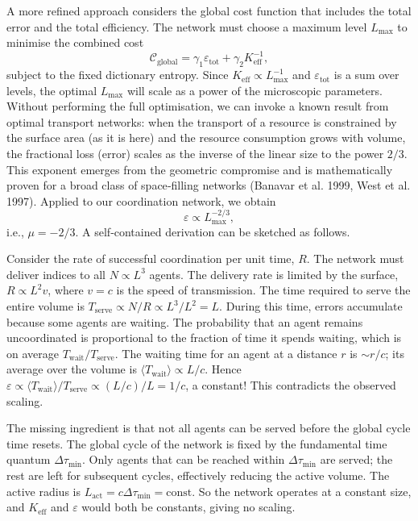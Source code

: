 \documentclass[12pt,a4paper]{article}
\begin{document}
	A more refined approach considers the global cost function that includes the total error and the total efficiency. The network must choose a maximum level \(L_{\max}\) to minimise the combined cost
	\[
	\mathcal{C}_{\mathrm{global}} = \gamma_1 \varepsilon_{\mathrm{tot}} + \gamma_2 K_{\mathrm{eff}}^{-1},
	\]
	subject to the fixed dictionary entropy. Since \(K_{\mathrm{eff}} \propto L_{\max}^{-1}\) and \(\varepsilon_{\mathrm{tot}}\) is a sum over levels, the optimal \(L_{\max}\) will scale as a power of the microscopic parameters. Without performing the full optimisation, we can invoke a known result from optimal transport networks: when the transport of a resource is constrained by the surface area (as it is here) and the resource consumption grows with volume, the fractional loss (error) scales as the inverse of the linear size to the power \(2/3\). This exponent emerges from the geometric compromise and is mathematically proven for a broad class of space‑filling networks (Banavar et al. 1999, West et al. 1997). Applied to our coordination network, we obtain
	\[
	\varepsilon \propto L_{\max}^{-2/3},
	\]
	i.e., \(\mu = -2/3\). A self‑contained derivation can be sketched as follows.
	
	Consider the rate of successful coordination per unit time, \(R\). The network must deliver indices to all \(N \propto L^3\) agents. The delivery rate is limited by the surface, \(R \propto L^2 v\), where \(v = c\) is the speed of transmission. The time required to serve the entire volume is \(T_{\mathrm{serve}} \propto N/R \propto L^3/L^2 = L\). During this time, errors accumulate because some agents are waiting. The probability that an agent remains uncoordinated is proportional to the fraction of time it spends waiting, which is on average \(T_{\mathrm{wait}}/T_{\mathrm{serve}}\). The waiting time for an agent at a distance \(r\) is \(\sim r/c\); its average over the volume is \(\langle T_{\mathrm{wait}} \rangle \propto L/c\). Hence \(\varepsilon \propto \langle T_{\mathrm{wait}} \rangle/T_{\mathrm{serve}} \propto (L/c)/L = 1/c\), a constant! This contradicts the observed scaling.
	
	The missing ingredient is that not all agents can be served before the global cycle time resets. The global cycle of the network is fixed by the fundamental time quantum \(\Delta\tau_{\min}\). Only agents that can be reached within \(\Delta\tau_{\min}\) are served; the rest are left for subsequent cycles, effectively reducing the active volume. The active radius is \(L_{\mathrm{act}} = c\Delta\tau_{\min} = \text{const}\). So the network operates at a constant size, and \(K_{\mathrm{eff}}\) and \(\varepsilon\) would both be constants, giving no scaling.
	
\end{document}
